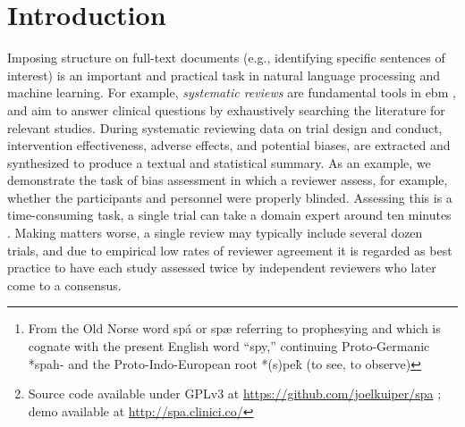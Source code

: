 \documentclass[runningheads,a4paper]{llncs}
\begin{document}
\begin{abstract}
Summarizing the evidence about medical interventions is an immense undertaking.
In part because unstructured \ac{pdf} documents remain the main vehicle for disseminating the results of clinical trials.
Clinicians and researchers typically manually extract and synthesise information from these \acp{pdf} which is then published as a \emph{systematic review}.
We introduce Spá\footnote{From the Old Norse word spá or spæ referring to prophesying and which is cognate with the present English word “spy,” continuing Proto-Germanic *spah- and the Proto-Indo-European root *(s)pe\`{k} (to see, to observe)}\footnote{Source code available under GPLv3 at \url{https://github.com/joelkuiper/spa} \cite{kuiper2014}; demo available at \url{http://spa.clinici.co/}}, a web-based \ac{pdf} viewer that allows for annotation and summarisation \acl{ml} modules to semi-automate the task of \ac{pdf} annotation and summarisation.
To illustrate, we demonstrate the use of Spá to semi-automate the assessment of bias in clinical trials.
Spá can visualize the output from hybrid models that simultaneously classify documents (e.g., identifying trials as low risk of various biases), and also annotates sentences or words that contribute most to the classification.
The Spá architecture is modular and new models may be trivially added, thus the tool made be widely useful in other domains with a \ac{pdf}-based literature, including law, physics, and biology.
\end{abstract}

\acresetall
{}

\section{Introduction}
\label{section:intro}

Imposing structure on full-text documents (e.g., identifying specific sentences of interest) is an important and practical task in natural language processing and machine learning.
For example, \emph{systematic reviews} are fundamental tools in \ac{ebm} \cite{sackett1996}, and aim to answer clinical questions by exhaustively searching the literature for relevant studies.
During systematic reviewing data on trial design and conduct, intervention effectiveness, adverse effects, and potential biases, are extracted and synthesized to produce a textual and statistical summary.
As an example, we demonstrate the task of bias assessment in which a reviewer assess, for example, whether the participants and personnel were properly blinded.
Assessing this is a time-consuming task, a single trial can take a domain expert around ten minutes \cite{Hartling2011}.
Making matters worse, a single review may typically include several dozen trials, and due to empirical low rates of reviewer agreement it is regarded as best practice to have each study assessed twice by independent reviewers who later come to a consensus\cite{Hartling2009}.
\end{document}
